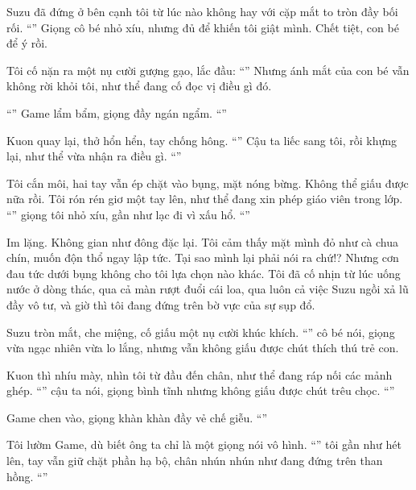 \documentclass[../main.tex]{subfiles}
\begin{document}
Suzu đã đứng ở bên cạnh tôi từ lúc nào không hay với cặp mắt to tròn đầy bối rối. ``'' Giọng cô bé nhỏ xíu, nhưng đủ để khiến tôi giật mình. Chết tiệt, con bé để ý rồi.

Tôi cố nặn ra một nụ cười gượng gạo, lắc đầu: ``'' Nhưng ánh mắt của con bé vẫn không rời khỏi tôi, như thể đang cố đọc vị điều gì đó.

``'' Game lẩm bẩm, giọng đầy ngán ngẩm. ``''

Kuon quay lại, thở hổn hển, tay chống hông. ``'' Cậu ta liếc sang tôi, rồi khựng lại, như thể vừa nhận ra điều gì. ``''

Tôi cắn môi, hai tay vẫn ép chặt vào bụng, mặt nóng bừng. Không thể giấu được nữa rồi. Tôi rón rén giơ một tay lên, như thể đang xin phép giáo viên trong lớp. ``'' giọng tôi nhỏ xíu, gần như lạc đi vì xấu hổ. ``''

Im lặng. Không gian như đông đặc lại. Tôi cảm thấy mặt mình đỏ như cà chua chín, muốn độn thổ ngay lập tức. Tại sao mình lại phải nói ra chứ!? Nhưng cơn đau tức dưới bụng không cho tôi lựa chọn nào khác. Tôi đã cố nhịn từ lúc uống nước ở dòng thác, qua cả màn rượt đuổi cái loa, qua luôn cả việc Suzu ngồi xả lũ đầy vô tư, và giờ thì tôi đang đứng trên bờ vực của sự sụp đổ.

Suzu tròn mắt, che miệng, cố giấu một nụ cười khúc khích. ``'' cô bé nói, giọng vừa ngạc nhiên vừa lo lắng, nhưng vẫn không giấu được chút thích thú trẻ con.

Kuon thì nhíu mày, nhìn tôi từ đầu đến chân, như thể đang ráp nối các mảnh ghép. ``'' cậu ta nói, giọng bình tĩnh nhưng không giấu được chút trêu chọc. ``''

Game chen vào, giọng khàn khàn đầy vẻ chế giễu. ``''

Tôi lườm Game, dù biết ông ta chỉ là một giọng nói vô hình. ``'' tôi gần như hét lên, tay vẫn giữ chặt phần hạ bộ, chân nhún nhún như đang đứng trên than hồng. ``''
\end{document}
